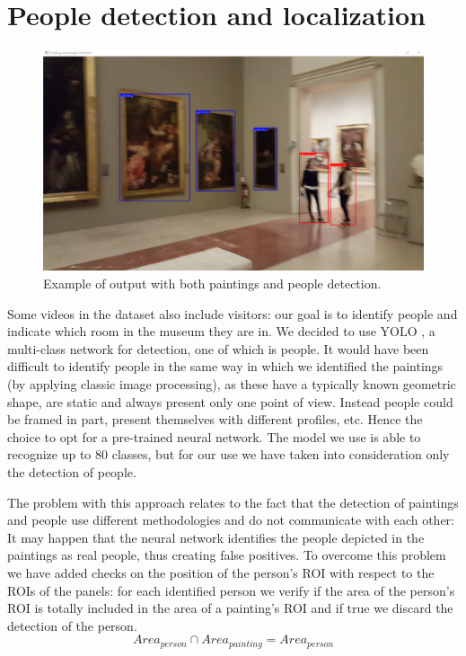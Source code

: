 \documentclass[10pt,twocolumn,letterpaper]{article}
\begin{document}
\section{People detection and localization}
\label{sec:PeopleDetectionAndLocalization}

\begin{figure}[t]
\begin{center}
\includegraphics[width=0.8\linewidth]{images/image3.png}
\end{center}
\caption{Example of output with both paintings and people detection.}
\label{fig:PeopleDetection}
\end{figure}

Some videos in the dataset also include visitors: our goal is to identify people and indicate which room in the museum they are in. We decided to use YOLO \cite{redmon2015unified}, a multi-class network for detection, one of which is people. It would have been difficult to identify people in the same way in which we identified the paintings (by applying classic image processing), as these have a typically known geometric shape, are static and always present only one point of view. Instead people could be framed in part, present themselves with different profiles, etc. Hence the choice to opt for a pre-trained neural network. The model we use is able to recognize up to 80 classes, but for our use we have taken into consideration only the detection of people.

The problem with this approach relates to the fact that the detection of paintings and people use different methodologies and do not communicate with each other: It may happen that the neural network identifies the people depicted in the paintings as real people, thus creating false positives. To overcome this problem we have added checks on the position of the person's ROI with respect to the ROIs of the panels: for each identified person we verify if the area of the person's ROI is totally included in the area of a painting's ROI and if true we discard the detection of the person.
\begin{equation}
\label{eq:DiscardPerson}
Area_{person} \cap Area_{painting} = Area_{person}
\end{equation}
\end{document}
